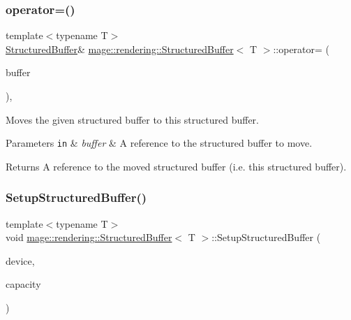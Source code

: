 \subsubsection{\texorpdfstring{operator=()}{operator=()}\hspace{0.1cm}{\footnotesize\ttfamily [2/2]}}
{\footnotesize\ttfamily template$<$typename T$>$ \\
\mbox{\hyperlink{classmage_1_1rendering_1_1_structured_buffer}{Structured\+Buffer}}\& \mbox{\hyperlink{classmage_1_1rendering_1_1_structured_buffer}{mage\+::rendering\+::\+Structured\+Buffer}}$<$ T $>$\+::operator= (\begin{DoxyParamCaption}\item[{\mbox{\hyperlink{classmage_1_1rendering_1_1_structured_buffer}{Structured\+Buffer}}$<$ T $>$ \&\&}]{buffer }\end{DoxyParamCaption})\hspace{0.3cm}{\ttfamily [default]}, {\ttfamily [noexcept]}}

Moves the given structured buffer to this structured buffer.


\begin{DoxyParams}[1]{Parameters}
\mbox{\tt in}  & {\em buffer} & A reference to the structured buffer to move. \\
\hline
\end{DoxyParams}
\begin{DoxyReturn}{Returns}
A reference to the moved structured buffer (i.\+e. this structured buffer). 
\end{DoxyReturn}
\mbox{\label{classmage_1_1rendering_1_1_structured_buffer_a41ed97f1fd3e77ba18abf25e957e82b2}} 
\subsubsection{\texorpdfstring{Setup\+Structured\+Buffer()}{SetupStructuredBuffer()}}
{\footnotesize\ttfamily template$<$typename T$>$ \\
void \mbox{\hyperlink{classmage_1_1rendering_1_1_structured_buffer}{mage\+::rendering\+::\+Structured\+Buffer}}$<$ T $>$\+::Setup\+Structured\+Buffer (\begin{DoxyParamCaption}\item[{I\+D3\+D11\+Device \&}]{device,  }\item[{size\+\_\+t}]{capacity }\end{DoxyParamCaption})\hspace{0.3cm}{\ttfamily [private]}}

